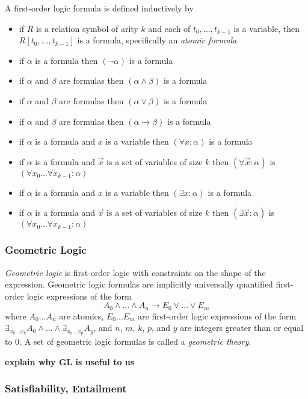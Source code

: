 			A first-order logic formula is defined inductively by
			\begin{itemize}
			\item if $R$ is a relation symbol of arity $k$ and each of $t_0 , \ldots , t_{k-1}$ is a variable, then $R[t_0,\ldots,t_{k-1}]$ is a formula, specifically an \emph{atomic formula}
			\item if $\alpha$ is a formula then $(\neg\alpha)$ is a formula
			\item if $\alpha$ and $\beta$ are formulas then $(\alpha\wedge\beta)$ is a formula
			\item if $\alpha$ and $\beta$ are formulas then $(\alpha\vee\beta)$ is a formula
			\item if $\alpha$ and $\beta$ are formulas then $(\alpha\to\beta)$ is a formula
			\item if $\alpha$ is a formula and $x$ is a variable then $(\forall x : \alpha)$ is a formula
			\item if $\alpha$ is a formula and $\vec{x}$ is a set of variables of size $k$ then $(\forall \vec{x} : \alpha)$ is $(\forall x_0 \ldots \forall x_{k-1} : \alpha)$
			\item if $\alpha$ is a formula and $x$ is a variable then $(\exists x : \alpha)$ is a formula
			\item if $\alpha$ is a formula and $\vec{x}$ is a set of variables of size $k$ then $(\exists \vec{x} : \alpha)$ is $(\forall x_0 \ldots \forall x_{k-1} : \alpha)$
			\end{itemize}

		\subsubsection{Geometric Logic}

			\emph{Geometric logic} is first-order logic with constraints on the
			shape of the expression.  Geometric logic formulas are implicitly
			universally quantified first-order logic expressions of the form \[A_0
			\wedge \ldots \wedge A_n \to E_0 \vee \ldots \vee E_m\] where $A_0
			\ldots A_n$ are atomics, $E_0 \ldots E_m$ are first-order logic
			expressions of the form $\exists_{x_0 \ldots x_k} A_0 \wedge \ldots
			\wedge \exists_{x_0 \ldots x_p} A_y$, and $n$, $m$, $k$, $p$, and $y$
			are integers greater than or equal to $0$. A set of geometric logic
			formulas is called a \emph{geometric theory}.

			\textbf{explain why GL is useful to us}

		\subsubsection{Satisfiability, Entailment}

